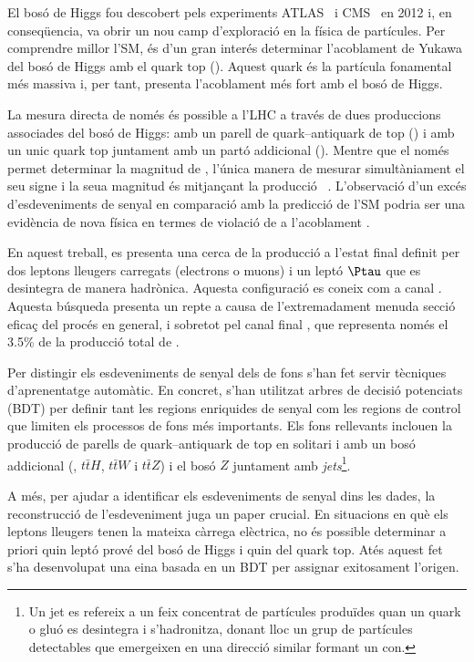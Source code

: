 El bosó de Higgs fou descobert pels experiments ATLAS~\cite{20121_ATLAS_HiggsDiscovery} 
i CMS~\cite{201230_CMS_HiggsDiscovery} en 2012 i, en conseqüencia, va obrir un nou camp d'exploració en la física 
de partícules. Per comprendre millor l'SM, és d'un gran interés determinar l'acoblament de Yukawa 
del bosó de Higgs amb el quark $\text{top}$ (\yt). Aquest quark és la partícula fonamental més massiva 
i, per tant, presenta l'acoblament més fort amb el bosó de Higgs.

La mesura directa de \yt només és possible a l'LHC a través de dues produccions associades 
del bosó de Higgs: amb un parell de quark--antiquark de $\text{top}$ (\ttH) i amb un unic quark $\text{top}$ 
juntament amb un partó addicional (\tHq). Mentre que el \ttH només permet determinar la 
magnitud de \yt, l'única manera de mesurar simultàniament el seu signe i la seua magnitud és mitjançant la
 producció \tH~\cite{Demartin:2015uha}. L'observació d'un excés d'esdeveniments de senyal en 
 comparació amb la predicció de l'SM podria ser una evidència de nova física en termes de violació 
 de \CP a l'acoblament \yt.
 
 En aquest treball, es presenta una cerca de la producció \tHq a l'estat final definit 
per dos leptons lleugers carregats (electrons o muons) i un leptó $\Ptau$ que es desintegra 
de manera hadrònica. Aquesta configuració es coneix com a canal \dileptau.
Aquesta búsqueda presenta un repte a causa de l'extremadament menuda secció eficaç del procés \tHq en general,
i sobretot pel canal final \dileptau, que representa només el 3.5\% de la producció total de \tHq.

Per distingir els esdeveniments de senyal \tHq dels de fons s'han fet servir tècniques d'aprenentatge automàtic. 
En concret, s'han utilitzat arbres de decisió potenciats (BDT) per definir tant les regions enriquides de senyal com les regions 
de control que limiten els processos de fons més importants. Els fons rellevants inclouen la producció de parells 
de quark--antiquark de $\text{top}$ en solitari i amb un bosó addicional (\ttbar, $t\bar{t}H$, $t\bar{t}W$ i $t\bar{t}Z$) i 
el bosó $Z$ juntament amb \textit{jets}\footnote{Un jet es refereix a un feix concentrat de partícules produïdes 
quan un quark o gluó es desintegra i s'hadronitza, donant lloc un grup de partícules detectables que emergeixen
en una direcció similar formant un con.}.


A més, per ajudar a identificar els esdeveniments de senyal dins les dades, la reconstrucció de l'esdeveniment juga 
un paper crucial. En situacions en què els leptons lleugers tenen la mateixa càrrega elèctrica, no és possible 
determinar a priori quin leptó prové del bosó de Higgs i quin del quark $\text{top}$. Atés aquest fet s'ha 
desenvolupat una eina basada en un BDT per assignar exitosament l'origen. 

